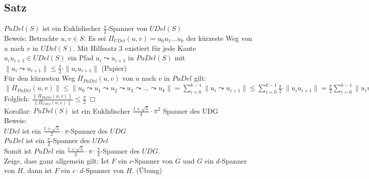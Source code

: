 \documentclass{article}
\begin{document}
\subsection*{Satz}
$PuDel(S)$ ist ein Euklidischer $\frac{\pi}{2}$-Spanner von
$UDel(S)$ \\
Beweis: Betrachte $u,v \in S$. Es sei $\Pi_{UDel}(u,v) = u_0u_1\ldots
u_k$ der kürzeste Weg von $u$ nach $v$ in $UDel(S)$. Mit Hilfssatz 3
existiert für jede Kante $u_iu_{i+1} \in UDel(S)$ ein Pfad $u_i \leadsto
u_{i+1}$ in $PuDel(S)$ mit $\|u_i \leadsto u_{i+1}\| \leq \frac{\pi}{2}
\cdot \|u_iu_{i+1}\|$ (Papier) \\
Für den kürzesten Weg $\Pi_{PuDel}(u,v)$ von $u$ nach $v$ in $PuDel$
gilt: $\displaystyle \|\Pi_{PuDel}(u,v)\| \leq \|u_0 \leadsto u_1
\leadsto u_2 \leadsto u_3 \leadsto \ldots \leadsto u_k \| =
\sum_{i=0}^{k-1}\|u_i \leadsto u_{i+1}\| \leq
\sum_{i=0}^{k-1}\frac{\pi}{2}\cdot\|u_iu_{i+1}\| =
\frac{\pi}{2}\sum_{i=0}^{k-1}\|u_iu_{i+1}\| =
\frac{\pi}{2}\cdot\|\Pi_{UDel}(u,v)\|$ \\
Folglich: $\displaystyle
\frac{\|\Pi_{PuDel}(u,v)\|}{\|\Pi_{UDel}(u,v)\|} \leq \frac{\pi}{2} \
\Box$ \\
Korollar: $PuDel(S)$ ist ein Euklidischer $\displaystyle
\frac{1+\sqrt{5}}{4}\cdot\pi^2$ Spanner des UDG \\
Beweis: \\
$UDel$ ist ein $\displaystyle \frac{1+\sqrt{5}}{2}\cdot\pi$-Spanner des
$UDG$ \\
$PuDel$ ist ein $\frac{\pi}{2}$-Spanner des $UDel$ \\
Somit ist $PuDel$ ein $\displaystyle
\frac{1+\sqrt{5}}{2}\cdot\pi\cdot\frac{\pi}{2}$-Spanner des $UDG$. \\
Zeige, dass ganz allgemein gilt: Ist $F$ ein $c$-Spanner von $G$ und $G$
ein $d$-Spanner von $H$, dann ist $F$ ein $c\cdot d$-Spanner von $H$.
(Übung) 
\end{document}
